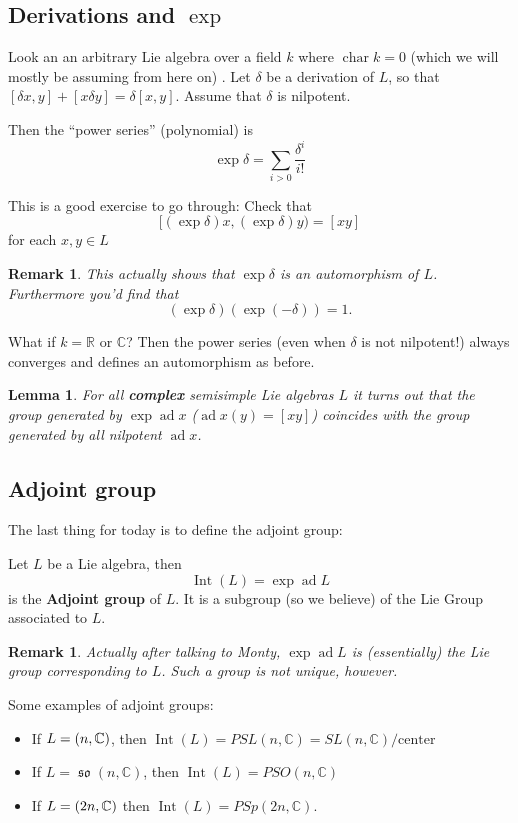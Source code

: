 \documentclass[12pt]{article}
\theoremstyle{nonumberbreak}
\theoremstyle{changebreak}
\newtheorem{lem}[thm]{Lemma}
\theoremstyle{nonumberbreak}
\theoremstyle{change}
\newtheorem{rmk}[thm]{Remark}
\newcommand*{\R}{
\mathbb{R}
}
\newcommand*{\C}{
\mathbb{C}
}
\DeclareMathOperator{\ch}{char}
\let\sl\relax
\DeclareMathOperator{\sl}{\mathfrak{sl}}
\DeclareMathOperator{\so}{\mathfrak{so}}
\let\sp\relax
\DeclareMathOperator{\sp}{\mathfrak{sp}}
\DeclareMathOperator{\ad}{ad}
\begin{document}
\subsection{Derivations and $\exp$}
Look an an arbitrary Lie algebra over a field $k$ where $\ch k=0$ (which we will mostly be assuming from here on)
. Let $\delta$ be a derivation of $L$, so that $[\delta x,y]+[x\delta y]=\delta[x,y]$. Assume that $\delta$ is nilpotent.

Then the ``power series'' (polynomial) is
\[\exp\delta=\sum_{i>0}\frac{\delta^i}{i!}\]
\begin{prob}
	This is a good exercise to go through: Check that
	\[[(\exp\delta)x,(\exp \delta)y)=[xy]\]
	for each $x,y\in L$
\end{prob}

\begin{rmk}
	This actually shows that $\exp\delta$ is an automorphism of $L$. Furthermore you'd find that
	\[(\exp\delta)(\exp(-\delta))=1.\]
\end{rmk}

What if $k=\R$ or $\C$? Then the power series (even when $\delta$ is not nilpotent!) always converges
and defines an automorphism as before.

\begin{lem}
	For all \textbf{complex} semisimple Lie algebras $L$ it turns out that the group
	generated by $\exp\ad x$ ($\ad x(y)=[xy]$) coincides with the group generated by all 
	nilpotent $\ad x$.
\end{lem}
\subsection{Adjoint group}
The last thing for today is to define the adjoint group:
\begin{defn}
	Let $L$ be a Lie algebra, then 
	\[\operatorname{Int}(L)=\exp\ad L\]
	is the \textbf{Adjoint group} of $L$. It is a subgroup (so we believe) of the Lie
	Group associated to $L$.
\end{defn}
\begin{rmk}
	Actually after talking to Monty, $\exp\ad L$ \textit{is} (essentially) the Lie group
	corresponding to $L$. Such a group is not unique, however.
\end{rmk}

Some examples of adjoint groups:
\begin{itemize}
	\item If $L=\sl(n,\C)$, then $\operatorname{Int}(L)=PSL(n,\C)=SL(n,\C)/\text{center}$
	\item If $L=\so(n,\C)$, then $\operatorname{Int}(L)=PSO(n,\C)$
	\item If $L=\sp(2n,\C)$ then $\operatorname{Int}(L)=PSp(2n,\C)$.
\end{itemize}
\end{document}
